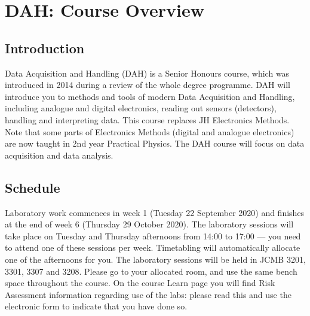 \chapter{DAH: Course Overview}
\label{sec:overview}

\section{Introduction}

Data Acquisition and Handling (DAH) is a Senior Honours course, which was introduced in 2014 during a review of the whole degree programme.
DAH will introduce you to methods and tools of modern Data Acquisition and Handling, including analogue and digital electronics, reading out sensors (detectors), handling and interpreting data.
This course replaces JH Electronics Methods.
Note that some parts of Electronics Methods (digital and analogue electronics) are now taught in 2nd year Practical Physics.
The DAH course will focus on data acquisition and data analysis.

\section{Schedule}

Laboratory work commences in week 1 (Tuesday 22 September 2020)
and finishes at the end of week 6 (Thursday 29 October 2020).
The laboratory sessions will take place on Tuesday and Thursday afternoons from 14:00 to 17:00 --- you need to attend one of these sessions per week.
Timetabling will automatically allocate one of the afternoons for you.
The laboratory sessions will be held in JCMB 3201, 3301, 3307 and 3208.
Please go to your allocated room, and use the same bench space throughout the course.
On the course Learn page you will find Risk Assessment information regarding use of the labs: please read this and use the electronic form to indicate that you have done so.

